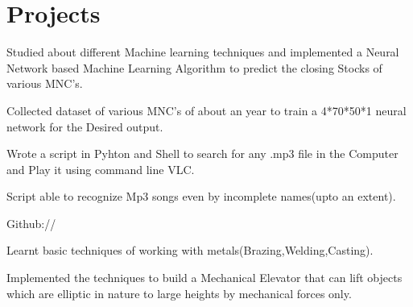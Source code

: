 \documentclass{deedy-resume-openfont}
\begin{document}
\hfill
\begin{minipage}[t]{0.66\textwidth} 


\section{Projects}

\vspace{\topsep} %
\begin{tightemize}
\item Studied about different Machine learning techniques and implemented a Neural Network based Machine Learning Algorithm to predict the closing Stocks of various MNC's. 
\item Collected dataset of various MNC's of about an year to train a 4*70*50*1 neural network for the Desired output. 
\end{tightemize}
\sectionsep

\begin{tightemize}
\item Wrote a script in Pyhton and Shell to search for any .mp3 file in the Computer and Play it using command line VLC.
\item Script able to recognize Mp3 songs even by incomplete names(upto an extent).
\item Github:// \href{https://github.com/saketharsh/RmSearch}{} \\
\end{tightemize}
\sectionsep

\begin{tightemize}
\item Learnt basic techniques of working with metals(Brazing,Welding,Casting).
\item Implemented the techniques to build a Mechanical Elevator that can lift objects which are elliptic in nature to large heights by mechanical forces only. 
\end{tightemize}
\sectionsep



\end{minipage}
\end{document}

